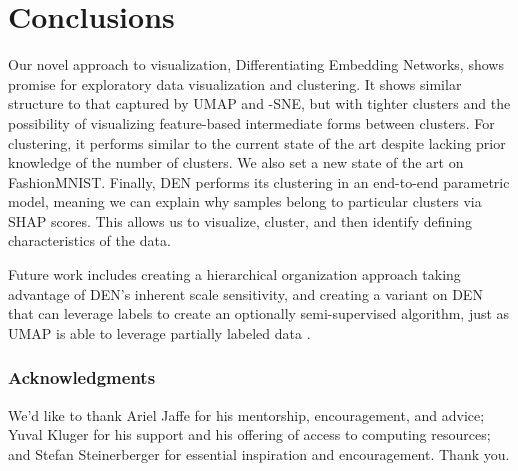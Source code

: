 \documentclass{article}
\begin{document}
\section{Conclusions}

Our novel approach to visualization, Differentiating Embedding Networks, shows promise for exploratory data visualization and clustering. It shows similar structure to that captured by UMAP and -SNE, but with tighter clusters and the possibility of visualizing feature-based intermediate forms between clusters. For clustering, it performs similar to the current state of the art despite lacking prior knowledge of the number of clusters. We also set a new state of the art on FashionMNIST. Finally, DEN performs its clustering in an end-to-end parametric model, meaning we can explain why samples belong to particular clusters via SHAP scores. This allows us to visualize, cluster, and then identify defining characteristics of the data.

Future work includes creating a hierarchical organization approach taking advantage of DEN's inherent scale sensitivity, and creating a variant on DEN that can leverage labels to create an optionally semi-supervised algorithm, just as UMAP is able to leverage partially labeled data \cite{2018arXivUMAP}.

\clearpage

\pagebreak

\subsubsection*{Acknowledgments}

We'd like to thank Ariel Jaffe for his mentorship, encouragement, and advice; Yuval Kluger for his support and his offering of access to computing resources; and Stefan Steinerberger for essential inspiration and encouragement. Thank you.
\end{document}
